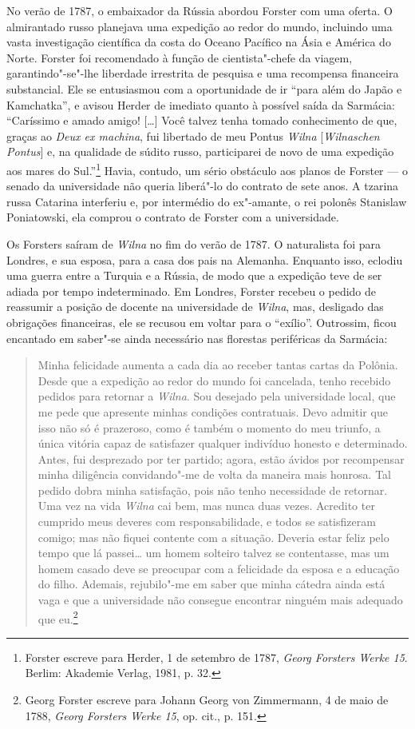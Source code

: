 No verão de 1787, o embaixador da Rússia abordou Forster com uma oferta.
O almirantado russo planejava uma expedição ao redor do mundo, incluindo
uma vasta investigação científica da costa do Oceano Pacífico na Ásia e
América do Norte. Forster foi recomendado à função de cientista"-chefe da
viagem, garantindo"-se"-lhe liberdade irrestrita de pesquisa e uma
recompensa financeira substancial. Ele se entusiasmou com a oportunidade
de ir ``para além do Japão e Kamchatka'', e avisou Herder de imediato
quanto à possível saída da Sarmácia: ``Caríssimo e amado amigo! [\ldots{}]
Você talvez tenha tomado conhecimento de que, graças ao \textit{Deux ex
machina}, fui libertado de meu Pontus \textit{Wilna} {[}\textit{Wilnaschen
Pontus}{]} e, na qualidade de súdito russo, participarei de novo de uma
expedição aos mares do Sul.''\footnote{Forster escreve para Herder, 1 de setembro de 1787, \textit{Georg Forsters Werke 15}. Berlim: Akademie Verlag, 1981, p. 32.} Havia, contudo, um sério obstáculo aos planos de Forster --- o senado da universidade não queria
liberá"-lo do contrato de sete anos. A tzarina russa Catarina 
interferiu e, por intermédio do ex"-amante, o rei polonês Stanislaw
Poniatowski, ela comprou o contrato de Forster com a universidade.

Os Forsters saíram de \textit{Wilna} no fim do verão de 1787. O naturalista foi
para Londres, e sua esposa, para a casa dos pais na Alemanha. Enquanto
isso, eclodiu uma guerra entre a Turquia e a Rússia, de modo que a
expedição teve de ser adiada por tempo indeterminado. Em Londres,
Forster recebeu o pedido de reassumir a posição de docente na
universidade de \textit{Wilna}, mas, desligado das obrigações financeiras, ele se
recusou em voltar para o ``exílio''. Outrossim, ficou encantado em
saber"-se ainda necessário nas florestas periféricas da Sarmácia:

\begin{quote}
Minha felicidade aumenta a cada dia ao receber tantas cartas da Polônia.
Desde que a expedição ao redor do mundo foi cancelada, tenho recebido
pedidos para retornar a \textit{Wilna}. Sou desejado pela universidade local, que
me pede que apresente minhas condições contratuais. Devo admitir que
isso não só é prazeroso, como é também o momento do meu triunfo, a única
vitória capaz de satisfazer qualquer indivíduo honesto e determinado.
Antes, fui desprezado por ter partido; agora, estão ávidos por
recompensar minha diligência convidando"-me de volta da maneira mais
honrosa. Tal pedido dobra minha satisfação, pois não tenho necessidade
de retornar. Uma vez na vida \textit{Wilna} cai bem, mas nunca duas vezes.
Acredito ter cumprido meus deveres com responsabilidade, e todos se
satisfizeram comigo; mas não fiquei contente com a situação. Deveria
estar feliz pelo tempo que lá passei\ldots{} um homem solteiro talvez se
contentasse, mas um homem casado deve se preocupar com a felicidade da
esposa e a educação do filho. Ademais, rejubilo"-me em saber que minha
cátedra ainda está vaga e que a universidade não consegue encontrar
ninguém mais adequado que eu.\footnote{Georg Forster escreve para Johann Georg von Zimmermann, 4 de maio de 1788, \textit{Georg Forsters Werke 15}, op. cit., p. 151.} 
\end{quote}


